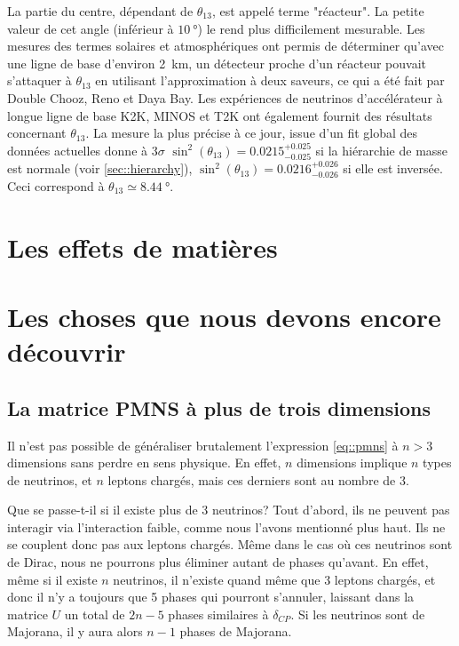             La partie du centre, dépendant de $\theta_{13}$, est appelé terme "réacteur". La petite valeur de cet angle (inférieur à $\SI{10}{\degree}$) le rend plus difficilement mesurable. Les mesures des termes solaires et atmosphériques ont permis de déterminer qu'avec une ligne de base d'environ \SI{2}{\kilo\meter}, un détecteur proche d'un réacteur pouvait s'attaquer à $\theta_{13}$ en utilisant l'approximation à deux saveurs, ce qui a été fait par Double Chooz\cite{ref_needed}, Reno\cite{red_needed} et Daya Bay\cite{ref_needed}. Les expériences de neutrinos d'accélérateur à longue ligne de base K2K\cite{ref_needed}, MINOS\cite{ref_needed} et T2K\cite{red_needed} ont également fournit des résultats concernant $\theta_{13}$. La mesure la plus précise à ce jour, issue d'un fit global des données actuelles donne à $3\sigma$ $\sin^2(\theta_{13})=0.0215^{+0.025}_{-0.025}$\cite{pdg2018} si la hiérarchie de masse est normale (voir \autoref{sec::hierarchy}), $\sin^2(\theta_{13})=0.0216^{+0.026}_{-0.026}$ si elle est inversée. Ceci correspond à $\theta_{13}\simeq\SI{8.44}{\degree}$.
            
    \section{Les effets de matières}
            
    \section{Les choses que nous devons encore découvrir}
            
        \subsection{La matrice PMNS à plus de trois dimensions}
            Il n'est pas possible de généraliser brutalement l'expression \eqref{eq::pmns} à $n>3$ dimensions sans perdre en sens physique. En effet, $n$ dimensions implique $n$ types de neutrinos, et $n$ leptons chargés, mais ces derniers sont au nombre de 3.
            
            Que se passe-t-il si il existe plus de 3 neutrinos? Tout d'abord, ils ne peuvent pas interagir via l'interaction faible, comme nous l'avons mentionné plus haut. Ils ne se couplent donc pas aux leptons chargés. Même dans le cas où ces neutrinos sont de Dirac, nous ne pourrons plus éliminer autant de phases qu'avant. En effet, même si il existe $n$ neutrinos, il n'existe quand même que 3 leptons chargés, et donc il n'y a toujours que 5 phases qui pourront s'annuler, laissant dans la matrice $U$ un total de $2n-5$ phases similaires à $\delta_{CP}$. Si les neutrinos sont de Majorana, il y aura alors $n-1$ phases de Majorana.
            
